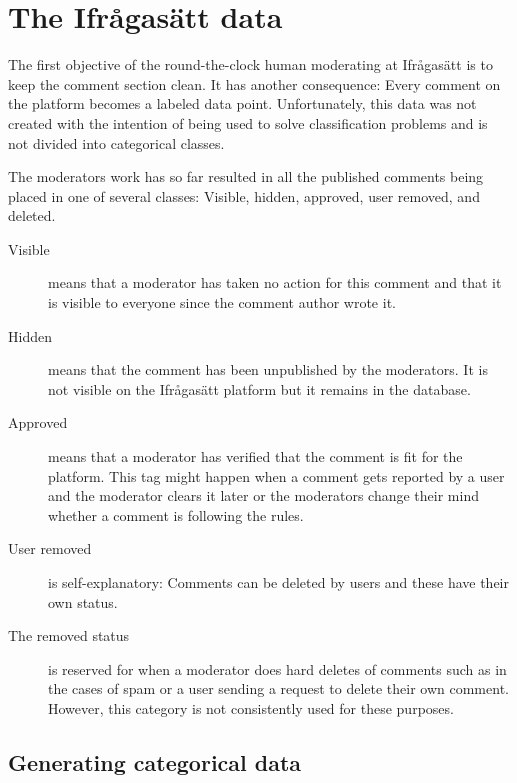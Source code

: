 \documentclass[nofilelist]{cslthse-msc}
\begin{document}
\section{The Ifrågasätt data}

The first objective of the round-the-clock human moderating at Ifrågasätt is to keep the comment section clean. It has another consequence: Every comment on the platform becomes a labeled data point. Unfortunately, this data was not created with the intention of being used to solve classification problems and is not divided into categorical classes.

The moderators work has so far resulted in all the published comments being placed in one of several classes: Visible, hidden, approved, user removed, and deleted.%
\begin{description}
  \item[Visible] means that a moderator has taken no action for this comment and that it is visible to everyone since the comment author wrote it.
  \item[Hidden] means that the comment has been unpublished by the moderators. It is not visible on the Ifrågasätt platform but it remains in the database.
\item[Approved] means that a moderator has verified that the comment is fit for the platform. This tag might happen when a comment gets reported by a user and the moderator clears it later or the moderators change their mind whether a comment is following the rules. 
\item[User removed] is self-explanatory: Comments can be deleted by users and these have their own status. 

\item[The removed status] is reserved for when a moderator does hard deletes of comments such as in the cases of spam or a user sending a request to delete their own comment. However, this category is not consistently used for these purposes.
\end{description}

\subsection{Generating categorical data}
\end{document}
